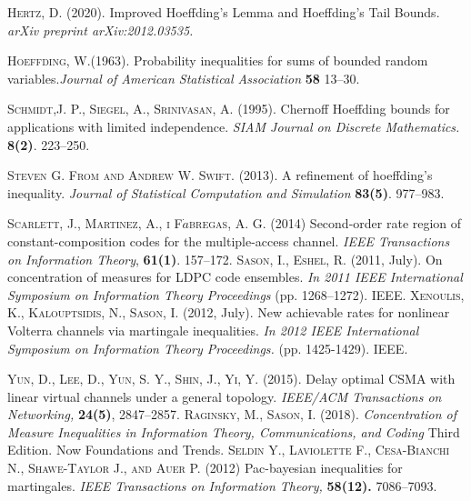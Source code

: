 \documentclass[journal]{IEEEtran}
\begin{document}
%
%
\begin{thebibliography}{16}
\textsc{Hertz, D.} (2020). Improved Hoeffding's Lemma and Hoeffding's Tail Bounds. \textit{ arXiv preprint arXiv:2012.03535.}

\textsc{Hoeffding, W.}(1963). Probability inequalities for sums of bounded random variables.\textit{Journal of American Statistical Association}  \textbf{58} 13--30.

\textsc{Schmidt,J. P., Siegel, A., Srinivasan, A.} (1995). Chernoff Hoeffding bounds for applications with limited independence. \textit{SIAM Journal on Discrete Mathematics.} \textbf{8(2)}. 223--250.

\textsc{Steven G. From and Andrew W. Swift.} (2013).
A refinement of hoeffding's inequality.
 \textit{Journal of Statistical Computation and Simulation}
\textbf{83(5)}. 977--983.

\textsc{Scarlett, J., Martinez, A., i F$\dot{a}$bregas, A. G.} (2014)
 Second-order rate region of constant-composition codes for the multiple-access channel.
\textit{IEEE Transactions on Information Theory}, \textbf{61(1)}. 157--172.
\textsc{Sason, I., Eshel, R.} (2011, July). On concentration of measures for LDPC code ensembles. \textit{In 2011 IEEE International Symposium on Information Theory Proceedings} (pp. 1268--1272). IEEE.
\textsc{Xenoulis, K., Kalouptsidis, N., Sason, I.} (2012, July). New achievable rates for nonlinear Volterra channels via martingale inequalities. \textit{ In 2012 IEEE International Symposium on Information Theory Proceedings.} (pp. 1425-1429). IEEE.

\textsc{Yun, D., Lee, D., Yun, S. Y., Shin, J., Yi, Y.} (2015). Delay optimal CSMA with linear virtual channels under a general topology. \textit{IEEE/ACM Transactions on Networking,}\textbf{ 24(5)}, 2847--2857.
\textsc{Raginsky, M., Sason, I.} (2018). \textit{Concentration of Measure Inequalities in Information Theory, Communications, and Coding } Third Edition. Now Foundations and Trends.
\textsc{Seldin Y., Laviolette F., Cesa-Bianchi N., Shawe-Taylor J., and Auer P.} (2012)
Pac-bayesian inequalities for martingales.
\textit{
IEEE Transactions on Information Theory,} \textbf{ 58(12).} 7086--7093.


\end{thebibliography}
\end{document}
